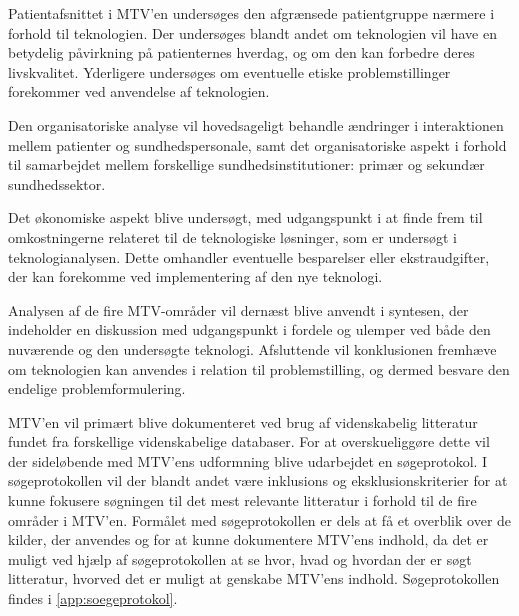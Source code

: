 Patientafsnittet i MTV’en undersøges den afgrænsede patientgruppe nærmere i forhold til teknologien. Der undersøges blandt andet om teknologien vil have en betydelig påvirkning på patienternes hverdag, og om den kan forbedre deres livskvalitet. Yderligere undersøges om eventuelle etiske problemstillinger forekommer ved anvendelse af teknologien.

Den organisatoriske analyse vil hovedsageligt behandle ændringer i interaktionen mellem patienter og sundhedspersonale, samt det organisatoriske aspekt i forhold til samarbejdet mellem forskellige sundhedsinstitutioner: primær og sekundær sundhedssektor.

Det økonomiske aspekt blive undersøgt, med udgangspunkt i at finde frem til omkostningerne relateret til de teknologiske løsninger, som er undersøgt i teknologianalysen. 
Dette omhandler eventuelle besparelser eller ekstraudgifter, der kan forekomme ved implementering af den nye teknologi.



Analysen af de fire MTV-områder vil dernæst blive anvendt i syntesen, der indeholder en diskussion med udgangspunkt i fordele og ulemper ved både den nuværende og den undersøgte teknologi. 
Afsluttende vil konklusionen fremhæve om teknologien kan anvendes i relation til problemstilling, og dermed besvare den endelige problemformulering.




MTV’en vil primært blive dokumenteret ved brug af videnskabelig litteratur fundet fra forskellige videnskabelige databaser. For at overskueliggøre dette vil der sideløbende med MTV’ens udformning blive udarbejdet en søgeprotokol. I søgeprotokollen vil der blandt andet være inklusions og eksklusionskriterier for at kunne fokusere søgningen til det mest relevante litteratur i forhold til de fire områder i MTV’en. Formålet med søgeprotokollen er dels at få et overblik over de kilder, der anvendes og for at kunne dokumentere MTV’ens indhold, da det er muligt ved hjælp af søgeprotokollen at se hvor, hvad og hvordan der er søgt litteratur, hvorved det er muligt at genskabe MTV’ens indhold. Søgeprotokollen findes i \autoref{app:soegeprotokol}.





